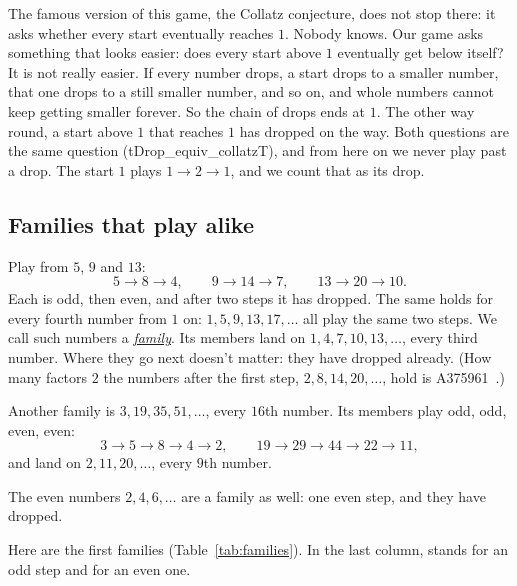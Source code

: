 \documentclass[10pt,a4paper,titlepage]{article}
\makeatletter
\newcommand{\termhere}[1]{\leavevmode
  \Hy@raisedlink{\hyper@anchorstart{term:#1}\hyper@anchorend}}
\newcommand{\keyterm}[2]{\hyperlink{box:#1}{\emph{#2}}}
\newcommand{\lean}[1]{\textsf{#1}}
\makeatother
\begin{document}
The famous version of this game, the Collatz conjecture, does not stop there: it
asks whether every start eventually reaches $1$. Nobody knows. Our game asks
something that looks easier: does every start above $1$ eventually get below
itself? It is not really easier. If every number drops, a start drops to a smaller
number, that one drops to a still smaller number, and so on, and whole numbers
cannot keep getting smaller forever. So the chain of drops ends at $1$. The other way
round, a start above $1$ that reaches $1$ has dropped on the way. Both questions are
the same question (\lean{tDrop\_equiv\_collatzT}), and from here on we never
play past a drop. The start $1$ plays $1 \to 2 \to 1$, and we count that as its
drop.

\subsection*{Families that play alike}

\termhere{family}Play from $5$, $9$ and $13$:
\[
5 \to 8 \to 4, \qquad 9 \to 14 \to 7, \qquad 13 \to 20 \to 10 .
\]
Each is odd, then even, and after two steps it has dropped. The same holds for
every fourth number from $1$ on: $1, 5, 9, 13, 17, \dots$ all play the same two
steps. We call such numbers a \keyterm{family}{family}. Its members land on
$1, 4, 7, 10, 13, \dots$, every third number. Where they go next doesn't matter:
they have dropped already. (How many factors $2$ the numbers after the first step, $2, 8, 14, 20, \dots$,
hold is A375961~\cite{OEIS_A375961}.)

Another family is $3, 19, 35, 51, \dots$, every $16$th number. Its members play
odd, odd, even, even:
\[
3 \to 5 \to 8 \to 4 \to 2, \qquad 19 \to 29 \to 44 \to 22 \to 11,
\]
and land on $2, 11, 20, \dots$, every $9$th number.

The even numbers $2, 4, 6, \dots$ are a family as well: one even step, and they have
dropped.

Here are the first families (Table~\ref{tab:families}).
In the last column,  stands for an odd step and  for an even one.
\end{document}
